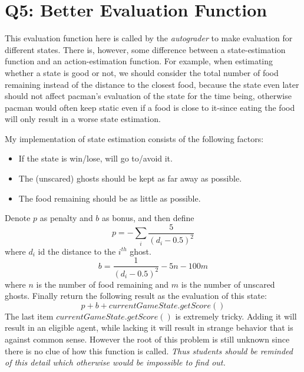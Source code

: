 \documentclass{article}
\begin{document}
\section{Q5: Better Evaluation Function}
This evaluation function here is called by the \textit{autograder} to make evaluation for different states. There is, however, some difference between a state-estimation function and an action-estimation function. For example, when estimating whether a state is good or not, we should consider the total number of food remaining instead of the distance to the closest food, because the state even later should not affect pacman's evaluation of the state for the time being, otherwise pacman would often keep static even if a food is close to it-since eating the food will only result in a worse state estimation.\par
My implementation of state estimation consists of the following factors:
\begin{itemize}
  \item If the state is win/lose, will go to/avoid it.
  \item The (unscared) ghosts should be kept as far away as possible.
  \item The food remaining should be as little as possible.
\end{itemize}
Denote $p$ as penalty and $b$ as bonus, and then define
$$ p = - \sum_{i} \frac{5}{(d_i - 0.5)^2} $$ where $d_i$ id the distance to the $i^{th}$ ghost.
$$ b = \frac{1}{(d_i - 0.5)^2} - 5n - 100m $$ where $n$ is the number of food remaining and $m$ is the number of unscared ghosts.
Finally return the following result as the evaluation of this state:
$$ p + b + currentGameState.getScore() $$
The last item $currentGameState.getScore()$ is extremely tricky. Adding it will result in an eligible agent, while lacking it will result in strange behavior that is against common sense. However the root of this problem is still unknown since there is no clue of how this function is called. \emph{Thus students should be reminded of this detail which otherwise would be impossible to find out.}
\end{document}
